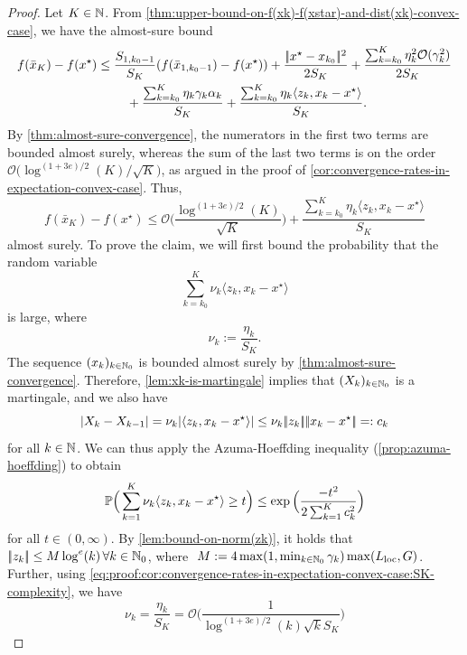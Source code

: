 \begin{proof}
    Let $K\in\mathbb{N}$.
    From \cref{thm:upper-bound-on-f(xk)-f(xstar)-and-dist(xk)-convex-case}, we have the almost-sure bound
    \begin{align*}
        f(\bar{x}_K) - f(x^\star)
        &\leq
        \frac{S_{1, k_0-1}}{S_K} (f(\bar{x}_{1, k_0-1}) - f(x^\star))
        + \frac{|\!|x^\star - x_{k_0}|\!|^2}{2S_K}
        + \frac{\sum_{k=k_0}^{K} \eta_k^2\mathcal{O}(\gamma_k^2)}{2 S_K} \notag \\
        &\phantom{===}
            + \frac{\sum_{k=k_0}^K \eta_k\gamma_k\alpha_k}{S_K}
            + \frac{\sum_{k=k_0}^K \eta_k\langle z_k, x_k - x^\star \rangle}{S_K}.
    \end{align*}
    By \cref{thm:almost-sure-convergence}, the numerators in the first two terms are bounded almost surely,
    whereas the sum of the last two terms is on the order
    $\mathcal{O}\big( \log^{(1 + 3e) / 2}(K) / \sqrt{K} \big)$,
    as argued in the proof of \cref{cor:convergence-rates-in-expectation-convex-case}.
    Thus,
    \[
        f(\bar{x}_K) - f(x^\star)
        \leq
        \mathcal{O}\Big( \frac{\log^{(1 + 3e) / 2}(K)}{\sqrt{K}} \Big)
            + \frac{\sum_{k=k_0}^K \eta_k \langle z_k, x_k - x^\star \rangle}{S_K}
    \]
    almost surely.
    To prove the claim, we will first bound the probability that the random variable
    \[
        \sum_{k=k_0}^K \nu_k \langle z_k, x_k - x^\star \rangle
    \]
    is large, where
    \[
        \nu_k := \frac{\eta_k}{S_K}.
    \]
    The sequence $(x_k)_{k\in\mathbb{N}_0}$ is bounded almost surely by
    \cref{thm:almost-sure-convergence}.
    Therefore, \cref{lem:xk-is-martingale} implies that $(X_k)_{k\in\mathbb{N}_0}$ is a martingale, and
    we also have
    \[
        |X_{k} - X_{k-1}| = \nu_k |\langle z_k, x_k - x^\star \rangle| \leq \nu_k |\!|z_k|\!| |\!|x_k - x^\star|\!|
        =: c_k
    \]
    for all $k\in\mathbb{N}$. We can thus apply the Azuma-Hoeffding inequality (\cref{prop:azuma-hoeffding}) to obtain
    \[
        \mathbb{P}\Big( \sum_{k=1}^K \nu_k \langle z_k, x_k - x^\star \rangle \geq t \Big)
        \leq
        \exp\Big( \frac{-t^2}{2 \sum_{k=1}^K c_k^2} \Big)
    \]
    for all $t \in (0, \infty)$.
    By \cref{lem:bound-on-norm(zk)}, it holds that $|\!|z_k|\!| \leq M \log^e(k) \, \forall k\in\mathbb{N}_0$, where
    $~M := 4\max(1, \min_{k\in\mathbb{N}_0}\gamma_k)\max(L_\text{loc}, G)$. Further,
    using \eqref{eq:proof:cor:convergence-rates-in-expectation-convex-case:SK-complexity}, we have
    \[
        \nu_k
        = \frac{\eta_k}{S_K}
        = \mathcal{O} \Big( \frac{1}{\log^{(1 + 3e) / 2} (k) \sqrt{k} S_K} \Big)
\]
\end{proof}
